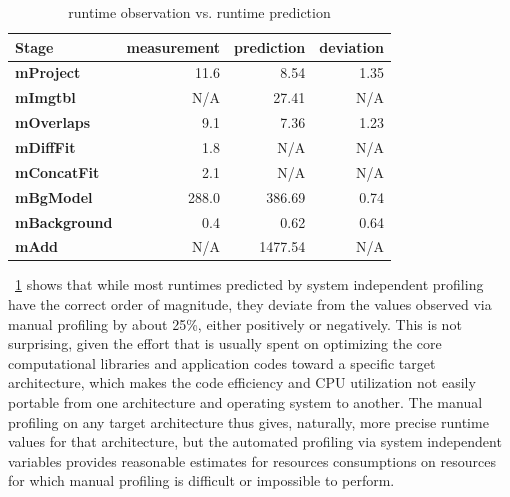 \documentclass[preprint,12pt]{elsarticle}
\newcommand{\katznote}[1]{ {\textcolor{blue}    { ***Dan:   #1 }}}
\newcommand{\zhaonote}[1]{{\textcolor{cyan}{ ***Zhao:  #1 }}}
\newcommand{\katznote}[1]{}
\newcommand{\zhaonote}[1]{}
\newcommand{\B}[1]{\textbf{#1}\xspace}
\begin{document}
\begin{table}[h]
\begin{center}
    \caption{runtime observation vs. runtime prediction}
    \begin{scriptsize}
        \begin{tabular}{@{}l@{}rrr@{}}
    \toprule
    \B{Stage}       & \B{measurement} & \B{prediction} &  \B{deviation} \\
    \midrule
    \B{mProject   } &        11.6 &       8.54 &       1.35 \\
    \B{mImgtbl    } &         N/A &      27.41 &        N/A \\
    \B{mOverlaps  } &         9.1 &       7.36 &       1.23 \\
    \B{mDiffFit   } &         1.8 &        N/A &        N/A \\
    \B{mConcatFit } &         2.1 &        N/A &        N/A \\
    \B{mBgModel   } &       288.0 &     386.69 &       0.74 \\
    \B{mBackground} &         0.4 &       0.62 &       0.64 \\
    \B{mAdd       } &         N/A &    1477.54 &        N/A \\
    \bottomrule
    \end{tabular}
    \end{scriptsize}
    \label{tb:prof-compare}
\end{center}   
\end{table}


\tablename~\ref{tb:prof-compare} shows that
while most runtimes predicted by system
independent profiling have the correct order of magnitude,
they deviate from the values observed via manual profiling by
about 25\%, either positively or negatively.  
This is not surprising, given the effort that is
usually spent on optimizing the core computational libraries and
application codes toward a specific target architecture, which makes
the code efficiency and CPU utilization not easily portable from one
architecture and operating system to another.  The manual
profiling on any target architecture thus gives, naturally, more
precise runtime values for that architecture, but the automated
profiling via system independent variables provides reasonable
estimates for resources consumptions on resources for which manual
profiling is difficult or impossible to perform. 

\end{document}

